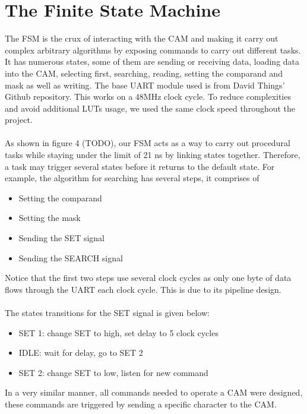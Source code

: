 \section{The Finite State Machine}
The FSM is the crux of interacting with the CAM and making it carry out complex arbitrary algorithms by exposing commands to carry out different tasks. 
It has numerous states, some of them are sending or receiving data, loading data into the CAM, selecting first, searching, reading, setting the comparand and mask as well as writing. 
The base UART module used is from David Things' Github repository. \cite{uart} This works on a 48MHz clock cycle.
To reduce complexities and avoid additional LUTs usage, we used the same clock speed throughout the project. 
\\\\
As shown in figure 4 (TODO), our FSM acts as a way to carry out procedural tasks while staying under the limit of 21 ns by linking states together. 
Therefore, a task may trigger several states before it returns to the default state. 
For example, the algorithm for searching has several steps, it comprises of
\begin{itemize}
    \item Setting the comparand 
    \item Setting the mask 
    \item Sending the SET signal 
    \item Sending the SEARCH signal 
\end{itemize}
Notice that the first two steps use several clock cycles as only one byte of data flows through the UART each clock cycle. 
This is due to its pipeline design. 
\\\\
The states transitions for the SET signal is given below:
\begin{itemize}
    \item  SET 1: change SET to high, set delay to 5 clock cycles
    \item  IDLE: wait for delay, go to SET 2
    \item  SET 2: change SET to low, listen for new command
\end{itemize}
In a very similar manner, all commands needed to operate a CAM were designed, these commands are triggered by sending a specific character to the CAM. 


